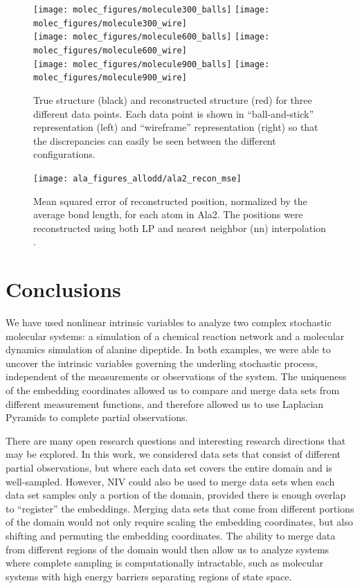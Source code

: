 \documentclass[aip,jcp,preprint]{revtex4-1}
\begin{document}
\begin{figure}[ht]
    \centering
    \texttt{[image: molec\_figures/molecule300\_balls]}
    \texttt{[image: molec\_figures/molecule300\_wire]}\\
    \texttt{[image: molec\_figures/molecule600\_balls]}
    \texttt{[image: molec\_figures/molecule600\_wire]}\\
    \texttt{[image: molec\_figures/molecule900\_balls]}
    \texttt{[image: molec\_figures/molecule900\_wire]}
    \caption{True structure (black) and reconstructed structure (red) for three different data points. Each data point is shown in ``ball-and-stick'' representation (left) and ``wireframe'' representation (right) so that the discrepancies can easily be seen between the different configurations.}
    \label{fig:ala_molecules}
\end{figure}

\begin{figure}
    \texttt{[image: ala\_figures\_allodd/ala2\_recon\_mse]}
    \caption{Mean squared error of reconstructed position, normalized by the average bond length, for each atom in Ala2.
    The positions were reconstructed using both LP and nearest neighbor (nn) interpolation .}
    \label{fig:ala_mse}
\end{figure}

\section{Conclusions} \label{sec:conclusions}
We have used nonlinear intrinsic variables to analyze two complex stochastic molecular systems: a simulation of a chemical reaction network and a molecular dynamics simulation of alanine dipeptide.
%
In both examples, we were able to uncover the intrinsic variables governing the underling stochastic process, independent of the measurements or observations of the system.
%
The uniqueness of the embedding coordinates allowed us to compare and merge data sets from different measurement functions, and therefore allowed us to use Laplacian Pyramids to complete partial observations.

There are many open research questions and interesting research directions that may be explored.
%
In this work, we considered data sets that consist of different partial observations, but where each data set covers the entire domain and is well-sampled.
%
However, NIV could also be used to merge data sets when each data set samples only a portion of the domain, provided there is enough overlap to ``register'' the embeddings.
%
Merging data sets that come from different portions of the domain would not only require scaling the embedding coordinates,
but also shifting and permuting the embedding coordinates.
%
The ability to merge data from different regions of the domain would then allow us to analyze systems where complete sampling is computationally intractable, such as molecular systems with high energy barriers separating regions of state space.
\end{document}
